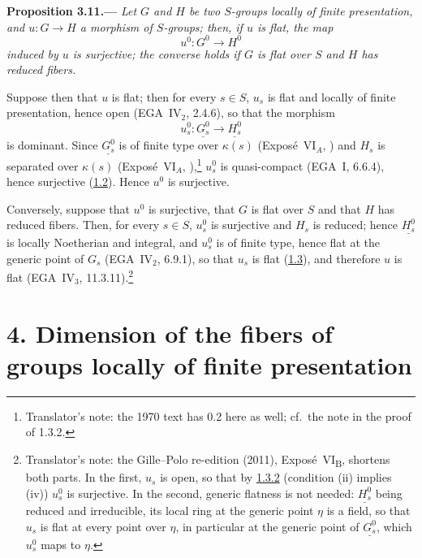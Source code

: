 
\medskip
{}\label{prop:sga3-VIB-3.11}%
\noindent\textbf{Proposition 3.11.---}
\emph{Let \(G\) and \(H\) be two \(S\)-groups locally of finite
presentation, and \(u:G\to H\) a morphism of \(S\)-groups; then, if \(u\)
is flat, the map}
\[
  u^0:G^0\longrightarrow H^0
\]
\emph{induced by \(u\) is surjective; the converse holds if \(G\) is flat
over \(S\) and \(H\) has reduced fibers.}

Suppose then that \(u\) is flat; then for every \(s\in S\), \(u_s\) is
flat and locally of finite presentation, hence open (EGA~IV\(_2\), 2.4.6),
so that the morphism
\[
  u_s^0:\underline{G_s^0}\longrightarrow\underline{H_s^0}
\]
is dominant. Since \(\underline{G_s^0}\) is of finite type over \(\kappa(s)\)
(Expos\'e~VI\(_A\), ) and \(H_s\) is separated over \(\kappa(s)\)
(Expos\'e~VI\(_A\), ),\footnote{Translator's note: the 1970 text has 0.2 here
as well; cf.\ the note in the proof of 1.3.2.} \(u_s^0\) is quasi-compact (EGA~I, 6.6.4), hence
surjective (\hyperref[prop:sga3-VIB-1.2]{1.2}). Hence \(u^0\) is surjective.

Conversely, suppose that \(u^0\) is surjective, that \(G\) is flat over
\(S\) and that \(H\) has reduced fibers. Then, for every \(s\in S\),
\(u_s^0\) is surjective and \(H_s\) is reduced; hence
\(\underline{H_s^0}\) is locally Noetherian and integral, and \(u_s^0\) is of
finite type, hence flat at the generic point of \(G_s\)
(EGA~IV\(_2\), 6.9.1), so that \(u_s\) is flat (\hyperref[prop:sga3-VIB-1.3]{1.3}), and therefore
\(u\) is flat (EGA~IV\(_3\), 11.3.11).\footnote{Translator's note: the Gille--Polo re-edition
(2011), Expos\'e~VI\textsubscript{B}, shortens both parts. In the first, \(u_s\) is open, so that by
\hyperref[cor:sga3-VIB-1.3.2]{1.3.2} (condition (ii) implies (iv)) \(u_s^0\) is surjective. In the second, generic
flatness is not needed: \(\underline{H_s^0}\) being reduced and irreducible, its local ring at the
generic point \(\eta\) is a field, so that \(u_s\) is flat at every point over \(\eta\), in particular at the
generic point of \(\underline{G_s^0}\), which \(u_s^0\) maps to \(\eta\).}

\section*{4. Dimension of the fibers of groups locally of finite presentation}
\label{sec:sga3-VIB-4}%

